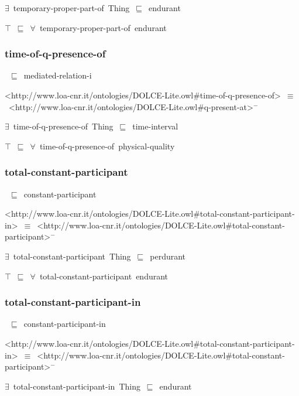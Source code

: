 \documentclass{article}
\begin{document}
\ensuremath{\exists}~temporary-proper-part-of~Thing~\ensuremath{\sqsubseteq}~endurant

\ensuremath{\top}~\ensuremath{\sqsubseteq}~\ensuremath{\forall}~temporary-proper-part-of~endurant

\subsubsection*{time-of-q-presence-of}

~\ensuremath{\sqsubseteq}~mediated-relation-i

<http://www.loa-cnr.it/ontologies/DOLCE-Lite.owl#time-of-q-presence-of>~\ensuremath{\equiv}~<http://www.loa-cnr.it/ontologies/DOLCE-Lite.owl#q-present-at>\ensuremath{^-}

\ensuremath{\exists}~time-of-q-presence-of~Thing~\ensuremath{\sqsubseteq}~time-interval

\ensuremath{\top}~\ensuremath{\sqsubseteq}~\ensuremath{\forall}~time-of-q-presence-of~physical-quality

\subsubsection*{total-constant-participant}

~\ensuremath{\sqsubseteq}~constant-participant

<http://www.loa-cnr.it/ontologies/DOLCE-Lite.owl#total-constant-participant-in>~\ensuremath{\equiv}~<http://www.loa-cnr.it/ontologies/DOLCE-Lite.owl#total-constant-participant>\ensuremath{^-}

\ensuremath{\exists}~total-constant-participant~Thing~\ensuremath{\sqsubseteq}~perdurant

\ensuremath{\top}~\ensuremath{\sqsubseteq}~\ensuremath{\forall}~total-constant-participant~endurant

\subsubsection*{total-constant-participant-in}

~\ensuremath{\sqsubseteq}~constant-participant-in

<http://www.loa-cnr.it/ontologies/DOLCE-Lite.owl#total-constant-participant-in>~\ensuremath{\equiv}~<http://www.loa-cnr.it/ontologies/DOLCE-Lite.owl#total-constant-participant>\ensuremath{^-}

\ensuremath{\exists}~total-constant-participant-in~Thing~\ensuremath{\sqsubseteq}~endurant
\end{document}
